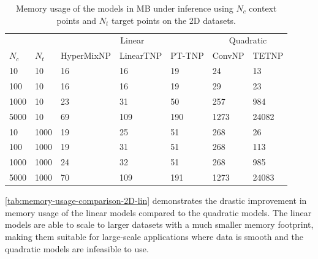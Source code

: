 \documentclass[../../main.tex]{subfiles}
\begin{document}
\begin{table}[H]
    \centering
    \begin{tabular}{@{}lllllll@{}}
    \toprule
    &  & \multicolumn{3}{c}{Linear} & \multicolumn{2}{c}{Quadratic} \\ \cmidrule(lr){3-5} \cmidrule(lr){6-7}
    $N_c$ & $N_t$  & HyperMixNP & LinearTNP & PT-TNP & ConvNP & TETNP \\ \midrule
    10     & 10    & 16         & 16        & 19     & 24     & 13    \\
    100    & 10    & 16         & 16        & 19     & 29     & 23    \\
    1000   & 10    & 23         & 31        & 50     & 257    & 984   \\
    5000   & 10    & 69         & 109       & 190    & 1273   & 24082 \\ \midrule
    10     & 1000  & 19         & 25        & 51     & 268    & 26    \\
    100    & 1000  & 19         & 31        & 51     & 268    & 113   \\
    1000   & 1000  & 24         & 32        & 51     & 268    & 985   \\
    5000   & 1000  & 70         & 109       & 191    & 1273   & 24083 \\ \bottomrule
    \end{tabular}
    \caption{Memory usage of the models in MB under inference using $N_c$ context points and $N_t$ target points on the 2D datasets.}
    \label{tab:memory-usage-comparison-2D-lin}
\end{table}
\FloatBarrier

\autoref{tab:memory-usage-comparison-2D-lin} demonstrates the drastic improvement in memory usage of the linear models compared to the quadratic models. The linear models are able to scale to larger datasets with a much smaller memory footprint, making them suitable for large-scale applications where data is smooth and the quadratic models are infeasible to use. 



\ifSubfilesClassLoaded{%
    \printbibliography{}
}{} 
\end{document}
